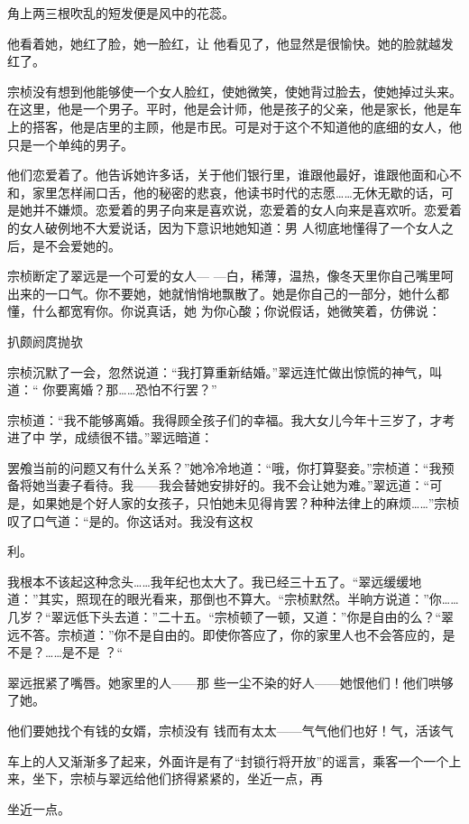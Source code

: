 \documentclass{article}
\begin{document}
角上两三根吹乱的短发便是风中的花蕊。 

    他看着她，她红了脸，她一脸红，让
他看见了，他显然是很愉快。她的脸就越发红了。 

    宗桢没有想到他能够使一个女人脸红，使她微笑，使她背过脸去，使她掉过头来。在这里，他是一个男子。平时，他是会计师，他是孩子的父亲，他是家长，他是车上的搭客，他是店里的主顾，他是市民。可是对于这个不知道他的底细的女人，他
只是一个单纯的男子。 

    他们恋爱着了。他告诉她许多话，关于他们银行里，谁跟他最好，谁跟他面和心不和，家里怎样闹口舌，他的秘密的悲哀，他读书时代的志愿……无休无歇的话，可是她并不嫌烦。恋爱着的男子向来是喜欢说，恋爱着的女人向来是喜欢听。恋爱着的女人破例地不大爱说话，因为下意识地她知道：男
人彻底地懂得了一个女人之后，是不会爱她的。 

    宗桢断定了翠远是一个可爱的女人—
\newpage
—白，稀薄，温热，像冬天里你自己嘴里呵出来的一口气。你不要她，她就悄悄地飘散了。她是你自己的一部分，她什么都懂，什么都宽宥你。你说真话，她
为你心酸；你说假话，她微笑着，仿佛说： 


    扒颇阏庹抛欤 

    宗桢沉默了一会，忽然说道：“我打算重新结婚。”翠远连忙做出惊慌的神气，叫道：“
你要离婚？那……恐怕不行罢？” 

    宗桢道：“我不能够离婚。我得顾全孩子们的幸福。我大女儿今年十三岁了，才考进了中
学，成绩很不错。”翠远暗道： 

    罢飧当前的问题又有什么关系？”她冷冷地道：“哦，你打算娶妾。”宗桢道：“我预备将她当妻子看待。我——我会替她安排好的。我不会让她为难。”翠远道：“可是，如果她是个好人家的女孩子，只怕她未见得肯罢？种种法律上的麻烦……”宗桢叹了口气道：“是的。你这话对。我没有这权
\newpage

利。 

    我根本不该起这种念头……我年纪也太大了。我已经三十五了。“翠远缓缓地道：”其实，照现在的眼光看来，那倒也不算大。“宗桢默然。半晌方说道：”你……几岁？“翠远低下头去道：”二十五。“宗桢顿了一顿，又道：”你是自由的么？“翠远不答。宗桢道：”你不是自由的。即使你答应了，你的家里人也不会答应的，是不是？……是不是
？“ 

    翠远抿紧了嘴唇。她家里的人——那
些一尘不染的好人——她恨他们！他们哄够了她。 

    他们要她找个有钱的女婿，宗桢没有
钱而有太太——气气他们也好！气，活该气 

    车上的人又渐渐多了起来，外面许是有了“封锁行将开放”的谣言，乘客一个一个上来，坐下，宗桢与翠远给他们挤得紧紧的，坐近一点，再

\newpage
坐近一点。 
\end{document}
